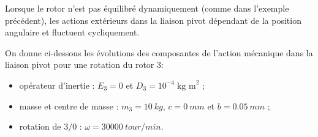 \documentclass[10pt,fleqn]{article} %
\begin{document}
\newpage
$$\quad$$
\newpage

\begin{prop}
Lorsque le rotor n'est pas équilibré dynamiquement (comme dans l'exemple précédent), les actions extérieurs dans la liaison pivot dépendant de la position angulaire et fluctuent cycliquement.

On donne ci-dessous les évolutions des composantes de l'action mécanique dans la liaison pivot pour une rotation du rotor 3:
\begin{itemize}
\item opérateur d'inertie : $E_3=0$ et $D_3=10^{-4}\;\text{kg m}^2$ ; 
\item masse et centre de masse : $m_3=\SI{10}{kg}$, $c=\SI{0}{mm}$ et $b=\SI{0,05}{mm}$ ; 
\item rotation de $3/0$ : $\omega=\SI{30000}{tour/min}$.
\end{itemize}

\begin{center}


\end{center}
\end{prop}
\end{document}
